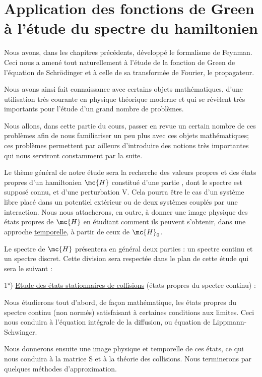\part{Application des fonctions de Green à l'étude du spectre du hamiltonien}
Nous avons, dans les chapitres précédents, développé le formalisme de Feynman.
Ceci nous a amené tout naturellement à l'étude de
la fonction de Green de l'équation de Schrödinger et à celle de sa transformée
de Fourier, le propagateur.

Nous avons ainsi fait connaissance avec certains objets mathématiques, d'une
utilisation très courante en physique théorique moderne et qui se révèlent très
importants pour l'étude d'un grand nombre
de problèmes.

Nous allons, dans cette partie du cours, passer en revue un
certain nombre de ces problèmes afin de nous familiariser un peu plus
avec ces objets mathématiques; ces problèmes permettent par ailleurs
d'introduire des notions très importantes qui nous serviront constamment
par la suite.

Le thème général de notre étude sera la recherche des valeurs
propres et des états propres d'un hamiltonien $\mc{H}$ constitué d'une partie
, dont le spectre est supposé connu, et d'une perturbation V. Cela pourra être
le cas d'un système libre placé dans un potentiel extérieur ou de 
deux systèmes couplés par une interaction. Nous nous attacherons, en outre,
à donner une image physique des états propres de $\mc{H}$ en étudiant comment
ils peuvent s'obtenir, dans une approche \ul{temporelle}, à partir de ceux de
$\mc{H}_0$.

Le spectre de $\mc{H}$ présentera en général deux parties : un spectre continu et un
spectre discret. Cette division sera respectée dans le
plan de cette étude qui sera le suivant :

1°) \ul{Etude des états stationnaires de collisions} (états propres
du spectre continu) :

Nous étudierons tout d'abord, de façon mathématique, les états
propres du spectre continu (non normés) satisfaisant à certaines conditions
aux limites. Ceci nous conduira à l'équation intégrale de la diffusion, ou
équation de Lippmann-Schwinger.

Nous donnerons ensuite une image physique et temporelle de ces
états, ce qui nous conduira à la matrice S et à la théorie des collisions.
Nous terminerons par quelques méthodes d'approximation.

